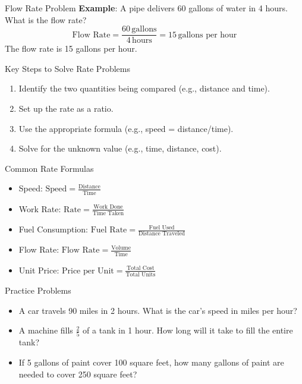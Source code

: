 \documentclass{beamer}
\begin{document}
\begin{frame}{Flow Rate Problem}
    \textbf{Example}: A pipe delivers 60 gallons of water in 4 hours. What is the flow rate? \\
    \vspace{0.3cm}
    \[
    \text{Flow Rate} = \frac{60 \, \text{gallons}}{4 \, \text{hours}} = 15 \, \text{gallons per hour}
    \]
    The flow rate is 15 gallons per hour.
\end{frame}

\begin{frame}{Key Steps to Solve Rate Problems}
    \begin{enumerate}
        \item Identify the two quantities being compared (e.g., distance and time).
        \item Set up the rate as a ratio.
        \item Use the appropriate formula (e.g., speed = distance/time).
        \item Solve for the unknown value (e.g., time, distance, cost).
    \end{enumerate}
\end{frame}

\begin{frame}{Common Rate Formulas}
    \begin{itemize}
        \item Speed: \( \text{Speed} = \frac{\text{Distance}}{\text{Time}} \)
        \item Work Rate: \( \text{Rate} = \frac{\text{Work Done}}{\text{Time Taken}} \)
        \item Fuel Consumption: \( \text{Fuel Rate} = \frac{\text{Fuel Used}}{\text{Distance Traveled}} \)
        \item Flow Rate: \( \text{Flow Rate} = \frac{\text{Volume}}{\text{Time}} \)
        \item Unit Price: \( \text{Price per Unit} = \frac{\text{Total Cost}}{\text{Total Units}} \)
    \end{itemize}
\end{frame}

\begin{frame}{Practice Problems}
    \begin{itemize}
        \item A car travels 90 miles in 2 hours. What is the car's speed in miles per hour?
        \item A machine fills \( \frac{2}{5} \) of a tank in 1 hour. How long will it take to fill the entire tank?
        \item If 5 gallons of paint cover 100 square feet, how many gallons of paint are needed to cover 250 square feet?
    \end{itemize}
\end{frame}
\end{document}
